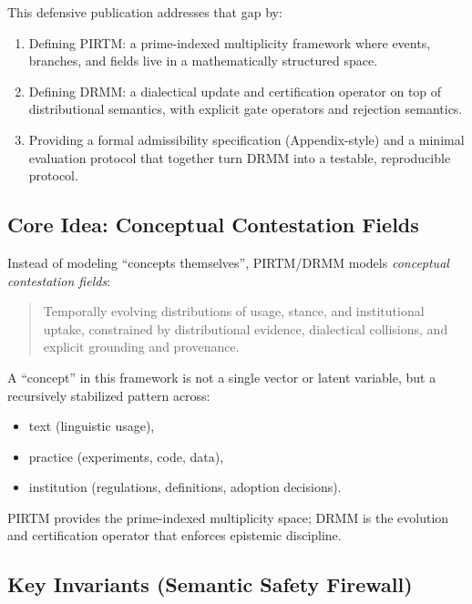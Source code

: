 \documentclass[11pt, a4paper]{article}
\begin{document}
This defensive publication addresses that gap by:
\begin{enumerate}[nosep]
  \item Defining PIRTM: a prime-indexed multiplicity framework where events, branches, and fields live in a mathematically structured space.
  \item Defining DRMM: a dialectical update and certification operator on top of distributional semantics, with explicit gate operators and rejection semantics.
  \item Providing a formal admissibility specification (Appendix-style) and a minimal evaluation protocol that together turn DRMM into a testable, reproducible protocol.
\end{enumerate}

\subsection{Core Idea: Conceptual Contestation Fields}

Instead of modeling ``concepts themselves'', PIRTM/DRMM models \emph{conceptual contestation fields}:
\begin{quote}
Temporally evolving distributions of usage, stance, and institutional uptake, constrained by distributional evidence, dialectical collisions, and explicit grounding and provenance.
\end{quote}

A ``concept'' in this framework is not a single vector or latent variable, but a recursively stabilized pattern across:
\begin{itemize}[nosep]
  \item text (linguistic usage),
  \item practice (experiments, code, data),
  \item institution (regulations, definitions, adoption decisions).
\end{itemize}

PIRTM provides the prime-indexed multiplicity space; DRMM is the evolution and certification operator that enforces epistemic discipline.

\subsection{Key Invariants (Semantic Safety Firewall)}
\end{document}
